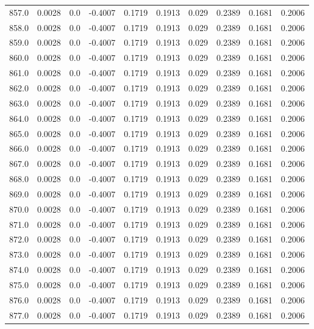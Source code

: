 \begin{longtable}{lrrrrrrrrr}
857.0 & 0.0028 & 0.0 & -0.4007 & 0.1719 & 0.1913 & 0.029 & 0.2389 & 0.1681 & 0.2006 \\
858.0 & 0.0028 & 0.0 & -0.4007 & 0.1719 & 0.1913 & 0.029 & 0.2389 & 0.1681 & 0.2006 \\
859.0 & 0.0028 & 0.0 & -0.4007 & 0.1719 & 0.1913 & 0.029 & 0.2389 & 0.1681 & 0.2006 \\
860.0 & 0.0028 & 0.0 & -0.4007 & 0.1719 & 0.1913 & 0.029 & 0.2389 & 0.1681 & 0.2006 \\
861.0 & 0.0028 & 0.0 & -0.4007 & 0.1719 & 0.1913 & 0.029 & 0.2389 & 0.1681 & 0.2006 \\
862.0 & 0.0028 & 0.0 & -0.4007 & 0.1719 & 0.1913 & 0.029 & 0.2389 & 0.1681 & 0.2006 \\
863.0 & 0.0028 & 0.0 & -0.4007 & 0.1719 & 0.1913 & 0.029 & 0.2389 & 0.1681 & 0.2006 \\
864.0 & 0.0028 & 0.0 & -0.4007 & 0.1719 & 0.1913 & 0.029 & 0.2389 & 0.1681 & 0.2006 \\
865.0 & 0.0028 & 0.0 & -0.4007 & 0.1719 & 0.1913 & 0.029 & 0.2389 & 0.1681 & 0.2006 \\
866.0 & 0.0028 & 0.0 & -0.4007 & 0.1719 & 0.1913 & 0.029 & 0.2389 & 0.1681 & 0.2006 \\
867.0 & 0.0028 & 0.0 & -0.4007 & 0.1719 & 0.1913 & 0.029 & 0.2389 & 0.1681 & 0.2006 \\
868.0 & 0.0028 & 0.0 & -0.4007 & 0.1719 & 0.1913 & 0.029 & 0.2389 & 0.1681 & 0.2006 \\
869.0 & 0.0028 & 0.0 & -0.4007 & 0.1719 & 0.1913 & 0.029 & 0.2389 & 0.1681 & 0.2006 \\
870.0 & 0.0028 & 0.0 & -0.4007 & 0.1719 & 0.1913 & 0.029 & 0.2389 & 0.1681 & 0.2006 \\
871.0 & 0.0028 & 0.0 & -0.4007 & 0.1719 & 0.1913 & 0.029 & 0.2389 & 0.1681 & 0.2006 \\
872.0 & 0.0028 & 0.0 & -0.4007 & 0.1719 & 0.1913 & 0.029 & 0.2389 & 0.1681 & 0.2006 \\
873.0 & 0.0028 & 0.0 & -0.4007 & 0.1719 & 0.1913 & 0.029 & 0.2389 & 0.1681 & 0.2006 \\
874.0 & 0.0028 & 0.0 & -0.4007 & 0.1719 & 0.1913 & 0.029 & 0.2389 & 0.1681 & 0.2006 \\
875.0 & 0.0028 & 0.0 & -0.4007 & 0.1719 & 0.1913 & 0.029 & 0.2389 & 0.1681 & 0.2006 \\
876.0 & 0.0028 & 0.0 & -0.4007 & 0.1719 & 0.1913 & 0.029 & 0.2389 & 0.1681 & 0.2006 \\
877.0 & 0.0028 & 0.0 & -0.4007 & 0.1719 & 0.1913 & 0.029 & 0.2389 & 0.1681 & 0.2006 \\

\end{longtable}
